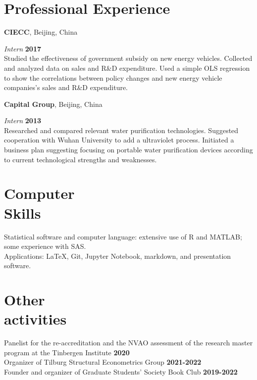 \documentclass[margin,line]{res}
\newenvironment{list1}{
  \begin{list}{\ding{113}}{%
      \setlength{\itemsep}{0in}
      \setlength{\parsep}{0in} \setlength{\parskip}{0in}
      \setlength{\topsep}{0in} \setlength{\partopsep}{0in} 
      \setlength{\leftmargin}{0.17in}}}{\end{list}}
\begin{document}
\begin{resume}
\section{\sc Professional Experience}
{\bf CIECC}, Beijing, China

\vspace{-.3cm}
{\em Intern} \hfill {\bf 2017}\\
Studied the effectiveness of government subsidy on new energy vehicles. Collected and analyzed data on sales and R\&D expenditure. Used a simple OLS regression to show the correlations between policy changes and new energy vehicle companies’s sales and R\&D expenditure.

{\bf Capital Group}, Beijing, China

\vspace{-.3cm}
{\em Intern} \hfill {\bf 2013}\\
Researched and compared relevant water purification technologies. Suggested cooperation with Wuhan University to add a ultraviolet process. Initiated a business plan suggesting focusing on portable water purification devices according to current technological strengths and weaknesses.

\section{\sc Computer \\ Skills} 
Statistical software and computer language:  extensive use of R and MATLAB; some experience with SAS.\\
Applications: \LaTeX, Git, Jupyter Notebook, markdown, and presentation software.%

\section{\sc Other \\ activities} 
Panelist for the re-accreditation and the NVAO assessment of the research master program at the Tinbergen Institute \hfill {\bf 2020}\\
Organizer of Tilburg Structural Econometrics Group \hfill {\bf 2021-2022}\\
Founder and organizer of Graduate Students' Society Book Club \hfill {\bf 2019-2022}\\


\end{resume}
\end{document}
